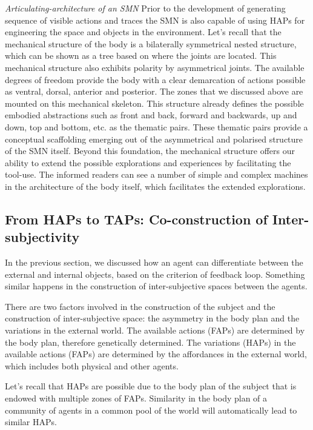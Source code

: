 {{{{{\emph{Articulating-architecture of an SMN} Prior to the development of generating sequence of visible actions and traces the SMN is also capable of using HAPs for engineering the space and objects in the environment. Let's recall that the mechanical structure of the body is a bilaterally symmetrical nested structure, which can be shown as a tree based on where the joints are located. This mechanical structure also exhibits polarity by asymmetrical joints. The available degrees of freedom provide the body with a clear demarcation of actions possible as ventral, dorsal, anterior and posterior. The zones that we discussed above are mounted on this mechanical skeleton. This structure already defines the possible embodied abstractions such as front and back, forward and backwards, up and down, top and bottom, etc. as the thematic pairs. These thematic pairs provide a conceptual scaffolding emerging out of the asymmetrical and polarised structure of the SMN itself. Beyond this foundation, the mechanical structure offers our ability to extend the possible explorations and experiences by facilitating the tool-use. The informed readers can see a number of simple and complex machines in the architecture of the body itself, which facilitates the extended explorations. 

\subsection{From HAPs to TAPs: Co-construction of Inter-subjectivity}
In the previous section, we discussed how an agent can differentiate between the external and internal objects, based on the criterion of feedback loop. Something similar happens in the construction of inter-subjective spaces between the agents. 

There are two factors involved in the construction of the subject and the construction of inter-subjective space: the asymmetry in the body plan and the variations in the external world. The available actions (FAPs) are determined by the body plan, therefore genetically determined. The variations (HAPs) in the available actions (FAPs) are determined by the affordances in the external world, which includes both physical and other agents. 

Let's recall that HAPs are possible due to the body plan of the subject that is endowed with multiple zones of FAPs. Similarity in the body plan of a community of agents in a common pool of the world will automatically lead to similar HAPs. 

}}}}}
